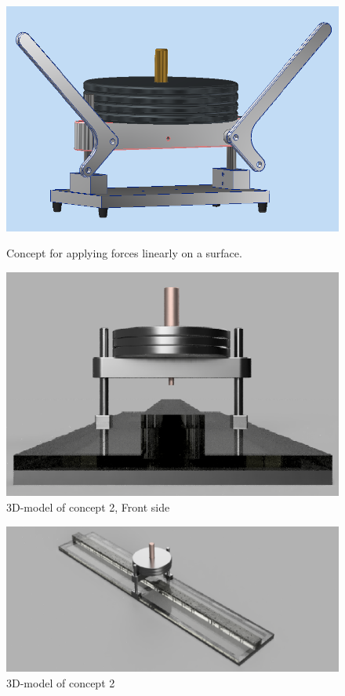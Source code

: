 \begin{figure}[!htb]
   \begin{minipage}{0.485\textwidth}
     \centering
     \includegraphics[width=.988\linewidth]{figures/linearpress2.png}
     \caption{Concept for applying forces linearly on a surface.}
     \label{fig:linearpress}
   \end{minipage}\hfill
   \begin{minipage}{0.485\textwidth}
     \centering
     \includegraphics[width=.985\linewidth]{figures/3dsketch_front2.png}
     \caption{3D-model of concept 2, Front side}
     \label{fig:3d-modelledsketch-front}
   \end{minipage}
\end{figure}
\begin{figure}
    \centering
    \includegraphics[scale=0.406]{figures/3dmodelledconcept.png}
    \caption{3D-model of concept 2}
    \label{fig:3d-modelledsketch}
\end{figure}

